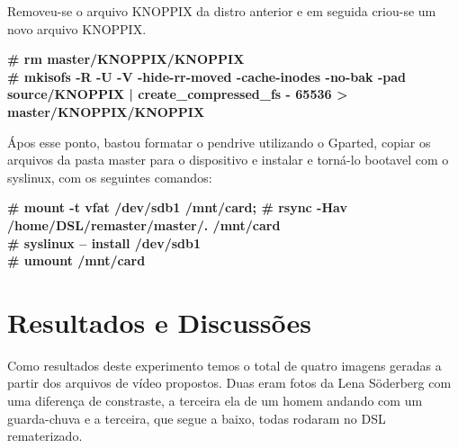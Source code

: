 \documentclass{ieee}
\begin{document}
Removeu-se o arquivo KNOPPIX da distro anterior e em seguida criou-se um novo arquivo KNOPPIX.
\begin{flushleft}
 \textbf{\# rm master/KNOPPIX/KNOPPIX\\
\# mkisofs -R -U -V -hide-rr-moved -cache-inodes -no-bak -pad source/KNOPPIX | create\_compressed\_fs - 65536 > master/KNOPPIX/KNOPPIX\\
}
\end{flushleft}

Ápos esse ponto, bastou formatar o pendrive utilizando o Gparted, copiar os arquivos da pasta master para o dispositivo e instalar e torná-lo
bootavel com o syslinux, com os seguintes comandos:
\begin{flushleft}
 \textbf{\# mount -t vfat /dev/sdb1 /mnt/card;
 \# rsync -Hav /home/DSL/remaster/master/. /mnt/card\\
\# syslinux -- install /dev/sdb1\\
\# umount /mnt/card\\}
\end{flushleft}

\section{Resultados e Discussões}

Como resultados deste experimento temos o total de quatro imagens geradas a partir dos arquivos de vídeo propostos.
Duas eram fotos da Lena Söderberg com uma diferença de constraste, a terceira ela de um homem andando com um guarda-chuva
e a terceira, que segue a baixo, todas rodaram no DSL rematerizado.
\end{document}
